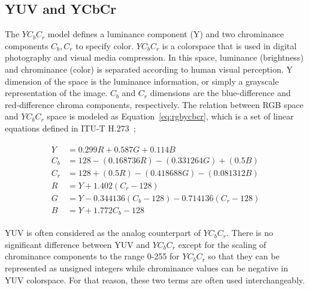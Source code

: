 \subsection{YUV and YCbCr}
The \(YC_{b}C_{r}\) model defines a luminance component (Y) and two chrominance components \(C_{b}, C_{r}\) to specify color. \(YC_{b}C_{r}\) is a colorspace that is used in digital photography and visual media compression. In this space, luminance (brightness) and chrominance (color) is separated according to human visual perception. Y dimension of the space is the luminance information, or simply a grayscale representation of the image. \(C_b\) and \(C_r\) dimensions are the blue-difference and red-difference chroma components, respectively. The relation between RGB space and \(YC_{b}C_{r}\) space is modeled as Equation~\ref*{eq:rgbycbcr}, which is a set of linear equations defined in ITU-T H.273~\cite{hamilton2004jpeg};

\begin{align}
    \label{eq:rgbycbcr}
    \begin{split}
        Y   & = 0.299 R+0.587 G+0.114 B                   \\
        C_b & = 128-(0.168736 R)-(0.331264 G)+(0.5 B)     \\
        C_r & = 128+(0.5 R)-(0.418688 G)-(0.081312 B)     \\
        R & = Y+1.402(C_{r}-128)                        \\
        G & = Y-0.344136(C_{b}-128)-0.714136(C_{r}-128) \\
        B & = Y+1.772C_b-128
    \end{split}
\end{align}

YUV is often considered as the analog counterpart of \(YC_{b}C_{r}\). There is no significant difference between YUV and \(YC_{b}C_{r}\) except for the scaling of chrominance components to the range 0-255 for \(YC_{b}C_{r}\) so that they can be represented as unsigned integers while chrominance values can be negative in YUV colorspace. For that reason, these two terms are often used interchangeably.

